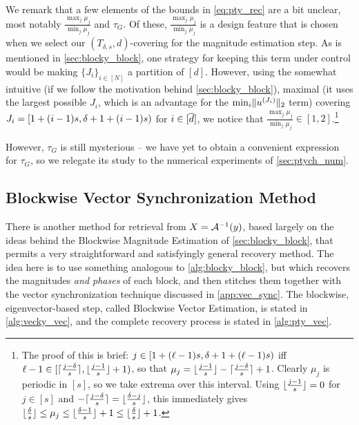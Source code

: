 We remark that a few elements of the bounds in \eqref{eq:pty_rec} are a bit unclear, most notably $\frac{\max_j \mu_j}{\min_j \mu_j}$ and $\tau_G$.  Of these, $\frac{\max_j \mu_j}{\min_j \mu_j}$ is a design feature that is chosen when we select our $(T_{\delta, s}, d)$-covering for the magnitude estimation step.  As is mentioned in \cref{sec:blocky_block}, one strategy for keeping this term under control would be making $\{J_i\}_{i \in [N]}$ a partition of $[d]$.  However, using the somewhat intuitive (if we follow the motivation behind \cref{sec:blocky_block}), maximal (it uses the largest possible $J_i$, which is an advantage for the $\min_i \lVert u^{(J_i)}\rVert_2$ term) covering $J_i = [1 + (i - 1)s, \delta + 1 + (i - 1)s)$ for $i \in [\overline{d}]$, we notice that $\frac{\max_j \mu_j}{\min_j \mu_j} \in [1, 2]$.\footnote{The proof of this is brief: $j \in [1 + (\ell - 1) s, \delta + 1 + (\ell - 1)s)$ iff $\ell - 1 \in [\lceil\frac{j- \delta}{s}\rceil, \lfloor\frac{j - 1}{s}\rfloor + 1)$, so that $\mu_j = \lfloor\frac{j - 1}{s}\rfloor - \lceil\frac{j - \delta}{s}\rceil + 1$.  Clearly $\mu_j$ is periodic in $[s]$, so we take extrema over this interval.  Using $\lfloor\frac{j-1}{s}\rfloor = 0$ for $j \in [s]$ and $-\lceil\frac{j - \delta}{s}\rceil = \lfloor\frac{\delta - j}{s}\rfloor$, this immediately gives $\lfloor\frac{\delta}{s}\rfloor \le \mu_j \le \lfloor\frac{\delta - 1}{s}\rfloor + 1 \le \lfloor\frac{\delta}{s}\rfloor + 1$.}

However, $\tau_G$ is still mysterious -- we have yet to obtain a convenient expression for $\tau_G$, so we relegate its study to the numerical experiments of \cref{sec:ptych_num}.

\subsection{Blockwise Vector Synchronization Method}
\label{sec:pty_vec_sync}
There is another method for retrieval from $X = \mathcal{A}^{-1}(y)$, based largely on the ideas behind the Blockwise Magnitude Estimation of \cref{sec:blocky_block}, that permits a very straightforward and satisfyingly general recovery method.  The idea here is to use something analogous to \cref{alg:blocky_block}, but which recovers the magnitudes \emph{and phases} of each block, and then stitches them together with the vector synchronization technique discussed in \cref{app:vec_sync}.  The blockwise, eigenvector-based step, called Blockwise Vector Estimation, is stated in \cref{alg:vecky_vec}, and the complete recovery process is stated in \cref{alg:pty_vec}.

